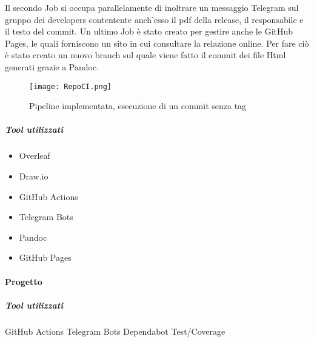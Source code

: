         Il secondo Job si occupa parallelamente di inoltrare un messaggio Telegram sul gruppo dei developers contentente anch'esso il pdf della release, il responsabile e il testo del commit.
        Un ultimo Job è stato creato per gestire anche le GitHub Pages, le quali forniscono un sito in cui consultare la relazione online. Per fare ciò è stato   creato un nuovo branch sul quale viene fatto il commit dei file Html generati grazie a Pandoc.
        \begin{figure}[h]
            \caption{Pipeline implementata, esecuzione di un commit senza tag}
            \centering
            \texttt{[image: RepoCI.png]}
        \end{figure}
        
        \subparagraph{Tool utilizzati}
        \begin{itemize}
            \item Overleaf
            \item Draw.io
            \item GitHub Actions
            \item Telegram Bots
            \item Pandoc
            \item GitHub Pages
        \end{itemize}

    \paragraph{Progetto}
        
        \subparagraph{Tool utilizzati}
        GitHub Actions
        Telegram Bots
        Dependabot
        Test/Coverage








